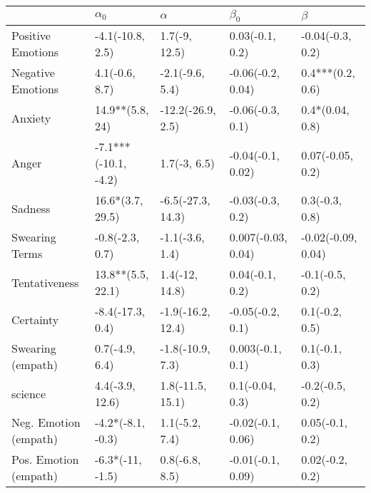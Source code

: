 \begin{tabular}{lllll}
\toprule
{} &            $\alpha_0$ &           $\alpha$ &           $\beta_0$ &             $\beta$ \\
\midrule
Positive Emotions     &      -4.1(-10.8, 2.5) &      1.7(-9, 12.5) &     0.03(-0.1, 0.2) &    -0.04(-0.3, 0.2) \\
Negative Emotions     &        4.1(-0.6, 8.7) &    -2.1(-9.6, 5.4) &   -0.06(-0.2, 0.04) &    0.4***(0.2, 0.6) \\
Anxiety               &       14.9**(5.8, 24) &  -12.2(-26.9, 2.5) &    -0.06(-0.3, 0.1) &     0.4*(0.04, 0.8) \\
Anger                 &  -7.1***(-10.1, -4.2) &       1.7(-3, 6.5) &   -0.04(-0.1, 0.02) &    0.07(-0.05, 0.2) \\
Sadness               &      16.6*(3.7, 29.5) &  -6.5(-27.3, 14.3) &    -0.03(-0.3, 0.2) &      0.3(-0.3, 0.8) \\
Swearing Terms        &       -0.8(-2.3, 0.7) &    -1.1(-3.6, 1.4) &  0.007(-0.03, 0.04) &  -0.02(-0.09, 0.04) \\
Tentativeness         &     13.8**(5.5, 22.1) &     1.4(-12, 14.8) &     0.04(-0.1, 0.2) &     -0.1(-0.5, 0.2) \\
Certainty             &      -8.4(-17.3, 0.4) &  -1.9(-16.2, 12.4) &    -0.05(-0.2, 0.1) &      0.1(-0.2, 0.5) \\
Swearing (empath)     &        0.7(-4.9, 6.4) &   -1.8(-10.9, 7.3) &    0.003(-0.1, 0.1) &      0.1(-0.1, 0.3) \\
science               &       4.4(-3.9, 12.6) &   1.8(-11.5, 15.1) &     0.1(-0.04, 0.3) &     -0.2(-0.5, 0.2) \\
Neg. Emotion (empath) &     -4.2*(-8.1, -0.3) &     1.1(-5.2, 7.4) &   -0.02(-0.1, 0.06) &     0.05(-0.1, 0.2) \\
Pos. Emotion (empath) &      -6.3*(-11, -1.5) &     0.8(-6.8, 8.5) &   -0.01(-0.1, 0.09) &     0.02(-0.2, 0.2) \\
\bottomrule
\end{tabular}
